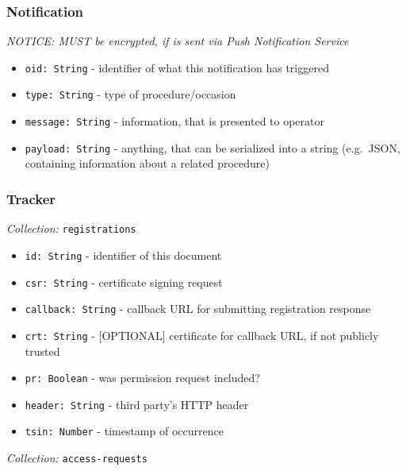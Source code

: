 \documentclass[12pt,english,a4paper,titlepage,cleardoublepage=empty,dottedtoc]{report}
\providecommand{\tightlist}{%
  \setlength{\itemsep}{0pt}\setlength{\parskip}{0pt}}
\begin{document}
\subsubsection{Notification}\label{notification}

\emph{NOTICE: MUST be encrypted, if is sent via Push Notification
Service}

\begin{itemize}
\tightlist
\item
  \texttt{oid:\ String} - identifier of what this notification has
  triggered
\item
  \texttt{type:\ String} - type of procedure/occasion
\item
  \texttt{message:\ String} - information, that is presented to operator
\item
  \texttt{payload:\ String} - anything, that can be serialized into a
  string (e.g.~JSON, containing information about a related procedure)
\end{itemize}

\subsubsection{Tracker}\label{tracker-2}

\emph{Collection:} \texttt{registrations}

\begin{itemize}
\tightlist
\item
  \texttt{id:\ String} - identifier of this document
\item
  \texttt{csr:\ String} - certificate signing request
\item
  \texttt{callback:\ String} - callback URL for submitting registration
  response
\item
  \texttt{crt:\ String} - {[}OPTIONAL{]} certificate for callback URL,
  if not publicly trusted
\item
  \texttt{pr:\ Boolean} - was permission request included?
\item
  \texttt{header:\ String} - third party's HTTP header
\item
  \texttt{tsin:\ Number} - timestamp of occurrence
\end{itemize}

\emph{Collection:} \texttt{access-requests}
\end{document}
